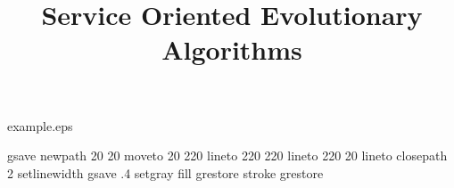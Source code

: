 %
%
%
%
%
\begin{filecontents*}{example.eps}





gsave
newpath
  20 20 moveto
  20 220 lineto
  220 220 lineto
  220 20 lineto
closepath
2 setlinewidth
gsave
  .4 setgray fill
grestore
stroke
grestore
\end{filecontents*}
%
\RequirePackage{fix-cm}
%
\documentclass[twocolumn]{svjour3}          %
%
\smartqed  %
%
\usepackage{graphicx}
\usepackage{color}
\usepackage{listings}
\usepackage{fancyvrb}
\usepackage{url}
\usepackage{fix2col}
\usepackage{natbib}


\lstset{
basicstyle=\ttfamily \scriptsize,
language=java,
frame=single,
stringstyle=\ttfamily,
showstringspaces=false
}

%
%
%
%
%


\title{Service Oriented Evolutionary Algorithms%
}


